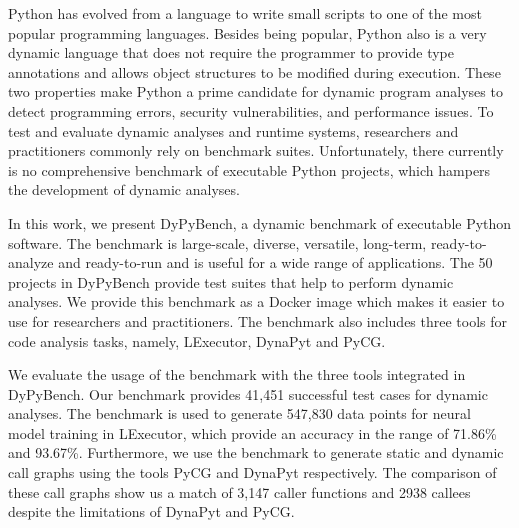 Python has evolved from a language to write small scripts to one of the most popular programming languages.
Besides being popular, Python also is a very dynamic language that does not require the programmer to provide type annotations and allows object structures to be modified during execution.
These two properties make Python a prime candidate for dynamic program analyses to detect programming errors, security vulnerabilities, and performance issues.
To test and evaluate dynamic analyses and runtime systems, researchers and practitioners commonly rely on benchmark suites.
Unfortunately, there currently is no comprehensive benchmark of executable Python projects, which hampers the development of dynamic analyses.

In this work, we present DyPyBench, a dynamic benchmark of executable Python software.
The benchmark is large-scale, diverse, versatile, long-term, ready-to-analyze and ready-to-run and is useful for a wide range of applications. 
The 50 projects in DyPyBench provide test suites that help to perform dynamic analyses.
We provide this benchmark as a Docker image which makes it easier to use for researchers and practitioners.
The benchmark also includes three tools for code analysis tasks, namely, LExecutor, DynaPyt and PyCG.

We evaluate the usage of the benchmark with the three tools integrated in DyPyBench.
Our benchmark provides 41,451 successful test cases for dynamic analyses.
The benchmark is used to generate 547,830 data points for neural model training in LExecutor, which provide an accuracy in the range of 71.86\% and 93.67\%.
Furthermore, we use the benchmark to generate static and dynamic call graphs using the tools PyCG and DynaPyt respectively.
The comparison of these call graphs show us a match of 3,147 caller functions and 2938 callees despite the limitations of DynaPyt and PyCG.
